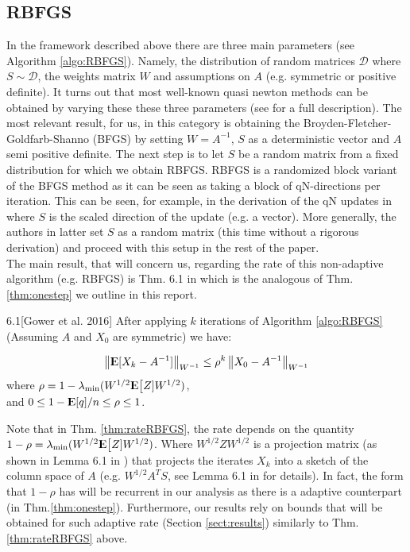 \documentclass[12pt,conference,compsocconf]{IEEEtran}
\newcommand\norm[1]{\left\lVert#1\right\rVert}
\newcommand{\E}{{\rm I\kern-.3em E}}
\begin{document}
\subsection{RBFGS}\label{sect:rbfgsbackground}
In the framework described above there are three main parameters (see Algorithm \ref{algo:RBFGS}). Namely, the distribution of random matrices $\mathcal{D}$ where $S\sim \mathcal{D}$, the weights matrix $W$ and assumptions on $A$ (e.g. symmetric or  positive definite). It turns out that most well-known quasi newton methods can be obtained by varying these these three parameters (see \cite{Gower1} for a full description). The most relevant result, for us, in this category is obtaining the Broyden-Fletcher-Goldfarb-Shanno (BFGS) by setting $W=A^{-1}$, $S$ as a deterministic vector and $A$ semi positive definite. The next step is to let $S$ be a random matrix from a fixed distribution for which we obtain RBFGS. RBFGS is a randomized block variant of the BFGS method as it can be seen as taking a block of qN-directions per iteration. This can be seen, for example, in the derivation of the qN updates in \cite{Gratton} where $S$ is the scaled direction of the update (e.g. a vector). More generally, the authors in \cite{Gratton} latter set $S$ as a random matrix (this time without a rigorous derivation) and proceed with this setup in the rest of the paper.\\
The main result, that will concern us, regarding the rate of this non-adaptive algorithm (e.g. RBFGS) is Thm. 6.1 in \cite{Gower1} which is the analogous of Thm. \ref{thm:onestep} we outline in this report.

\begin{customthm}{6.1}[Gower et al. 2016]\label{thm:rateRBFGS}
After applying $k$ iterations of Algorithm \ref{algo:RBFGS} (Assuming $A$ and $X_0$ are symmetric) we have:

\begin{align}\label{eq:progressRBFGS}
	\norm{\E[X_{k}-A^{-1}]}_{W^{-1}}\leq \rho^k \norm{X_0-A^{-1}}_{W^{-1}}
\end{align}
where $\rho=1-\lambda_{\text{min}}(W^{1/2}\E\big[Z]W^{1/2})$, \\ 
and $0\leq 1 - \E [q]/n \leq \rho \leq 1$.
\end{customthm}

Note that in Thm. \ref{thm:rateRBFGS}, the rate depends on the quantity $1-\rho =\lambda_{\text{min}}(W^{1/2}\E\big[Z]W^{1/2})$. Where $W^{1/2}ZW^{1/2}$ is a projection matrix (as shown in Lemma 6.1 in \cite{Gower1}) that projects the iterates $X_k$ into a sketch of the column space of $A$ (e.g. $W^{1/2}A^TS$, see Lemma 6.1 in \cite{Gower1} for details). In fact, the form that $1-\rho$ has will be recurrent in our analysis as there is a adaptive counterpart (in Thm.\ref{thm:onestep}). Furthermore, our results rely on bounds that will be obtained for such adaptive rate (Section \ref{sect:results}) similarly to Thm.\ref{thm:rateRBFGS} above.
\end{document}
